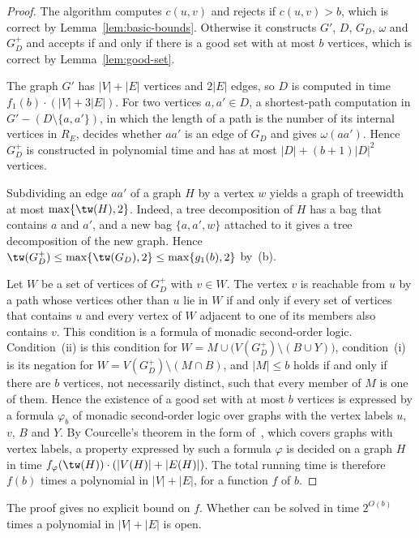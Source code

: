 \begin{proof}
The algorithm computes $c(u,v)$ and rejects if $c(u,v) > b$, which is correct by Lemma~\ref{lem:basic-bounds}.
Otherwise it constructs $G'$, $D$, $G_D$, $\omega$ and $G_D^+$ and accepts if and only if there is a good set with at most $b$ vertices, which is correct by Lemma~\ref{lem:good-set}.

The graph $G'$ has $|V| + |E|$ vertices and $2|E|$ edges, so $D$ is computed in time $f_1(b) \cdot (|V| + 3|E|)$.
For two vertices $a, a' \in D$, a shortest-path computation in $G' - (D \setminus \{a, a'\})$, in which the length of a path is the number of its internal vertices in $R_E$, decides whether $aa'$ is an edge of $G_D$ and gives $\omega(aa')$.
Hence $G_D^+$ is constructed in polynomial time and has at most $|D| + (b+1)|D|^2$ vertices.

Subdividing an edge $aa'$ of a graph $H$ by a vertex $w$ yields a graph of treewidth at most $\max\{\tw(H), 2\}$.
Indeed, a tree decomposition of $H$ has a bag that contains $a$ and $a'$, and a new bag $\{a, a', w\}$ attached to it gives a tree decomposition of the new graph.
Hence $\tw(G_D^+) \leq \max\{\tw(G_D), 2\} \leq \max\{g_1(b), 2\}$ by~(b).

Let $W$ be a set of vertices of $G_D^+$ with $v \in W$.
The vertex $v$ is reachable from $u$ by a path whose vertices other than $u$ lie in $W$ if and only if every set of vertices that contains $u$ and every vertex of $W$ adjacent to one of its members also contains $v$.
This condition is a formula of monadic second-order logic.
Condition~(ii) is this condition for $W = M \cup \bigl(V(G_D^+) \setminus (B \cup Y)\bigr)$, condition~(i) is its negation for $W = V(G_D^+) \setminus (M \cap B)$, and $|M| \leq b$ holds if and only if there are $b$ vertices, not necessarily distinct, such that every member of $M$ is one of them.
Hence the existence of a good set with at most $b$ vertices is expressed by a formula $\varphi_b$ of monadic second-order logic over graphs with the vertex labels $u$, $v$, $B$ and $Y$.
By Courcelle's theorem in the form of~\cite[Theorem~2.2]{Marx2013Separators}, which covers graphs with vertex labels, a property expressed by such a formula $\varphi$ is decided on a graph $H$ in time $f_\varphi(\tw(H)) \cdot (|V(H)| + |E(H)|)$.
The total running time is therefore $f(b)$ times a polynomial in $|V| + |E|$, for a function $f$ of $b$.
\end{proof}

The proof gives no explicit bound on $f$.
Whether \MinCutPath{} can be solved in time $2^{O(b)}$ times a polynomial in $|V| + |E|$ is open.

